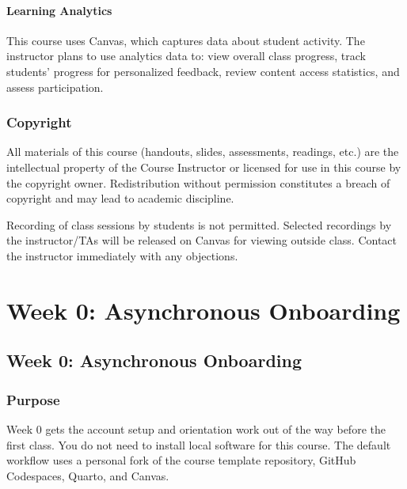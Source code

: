 \documentclass[
  letterpaper,
  DIV=11,
  numbers=noendperiod,
  oneside]{scrreprt}
\begin{document}
\subsection{Learning Analytics}\label{learning-analytics}

This course uses Canvas, which captures data about student activity. The
instructor plans to use analytics data to: view overall class progress,
track students' progress for personalized feedback, review content
access statistics, and assess participation.

\section{Copyright}\label{copyright}

All materials of this course (handouts, slides, assessments, readings,
etc.) are the intellectual property of the Course Instructor or licensed
for use in this course by the copyright owner. Redistribution without
permission constitutes a breach of copyright and may lead to academic
discipline.

Recording of class sessions by students is not permitted. Selected
recordings by the instructor/TAs will be released on Canvas for viewing
outside class. Contact the instructor immediately with any objections.

\part{Week 0: Asynchronous Onboarding}

\chapter*{Week 0: Asynchronous
Onboarding}\label{week-0-asynchronous-onboarding-1}


\section*{Purpose}\label{purpose}


Week 0 gets the account setup and orientation work out of the way before
the first class. You do not need to install local software for this
course. The default workflow uses a personal fork of the course template
repository, GitHub Codespaces, Quarto, and Canvas.
\end{document}
